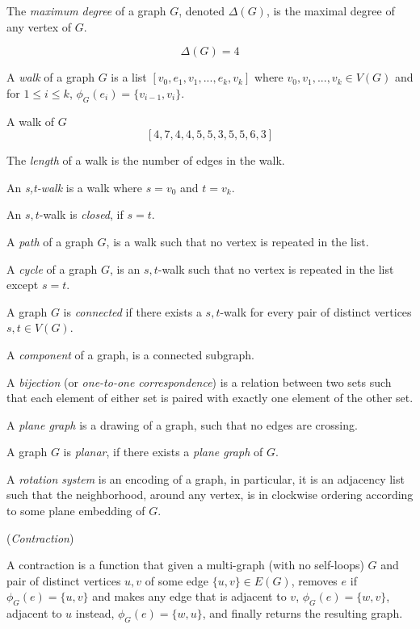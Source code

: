 \documentclass{article}
\begin{document}
	The \textit{maximum degree} of a graph $G$, denoted $\Delta(G)$, is the maximal degree of any vertex of $G$.

	$$\Delta(G) = 4$$

	A \textit{walk} of a graph $G$ is a list $[v_0,e_1,v_1,...,e_k,v_k]$ where $v_0,v_1,...,v_k \in V(G)$ and for $1 \leq i \leq k$, $\phi_{G}(e_i) = \{v_{i-1}, v_i\}$.

	A walk of $G$ $$[4,7,4,4,5,5,3,5,5,6,3]$$

	The \textit{length} of a walk is the number of edges in the walk.
	
	An \textit{s,t-walk} is a walk where $s = v_0$ and $t = v_k$.

	An $s,t$-walk is \textit{closed}, if $s = t$.

	A \textit{path} of a graph $G$, is a walk such that no vertex is repeated in the list.

	A \textit{cycle} of a graph $G$, is an $s,t$-walk such that no vertex is repeated in the list except $s=t$.

	A graph $G$ is \textit{connected} if there exists a $s,t$-walk for every pair of distinct vertices $s,t \in V(G)$.

	A \textit{component} of a graph, is a connected subgraph.

	A \textit{bijection} (or \textit{one-to-one correspondence}) is a relation between two sets such that each element of either set is paired with exactly one element of the other set.

	A \textit{plane graph} is a drawing of a graph, such that no edges are crossing.
	
	A graph $G$ is \textit{planar}, if there exists a \textit{plane graph} of $G$.

	A \textit{rotation system} is an encoding of a graph, in particular, it is an adjacency list such that the neighborhood, around any vertex, is in clockwise ordering according to some plane embedding of $G$.

	\begin{definition}\label{def:contraction}
		(\textit{Contraction})

		A contraction is a function that given a multi-graph (with no self-loops) $G$ and pair of distinct vertices $u,v$ of some edge $\{u,v\} \in E(G)$, removes $e$ if $\phi_G(e) = \{u,v\}$ and makes any edge that is adjacent to $v$, $\phi_G(e) = \{w,v\}$, adjacent to $u$ instead, $\phi_G(e) = \{w,u\}$, and finally returns the resulting graph.
	\end{definition}
\end{document}
